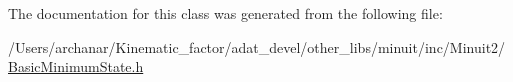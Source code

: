 The documentation for this class was generated from the following file\+:\begin{DoxyCompactItemize}
\item 
/\+Users/archanar/\+Kinematic\+\_\+factor/adat\+\_\+devel/other\+\_\+libs/minuit/inc/\+Minuit2/\mbox{\hyperlink{other__libs_2minuit_2inc_2Minuit2_2BasicMinimumState_8h}{Basic\+Minimum\+State.\+h}}\end{DoxyCompactItemize}
